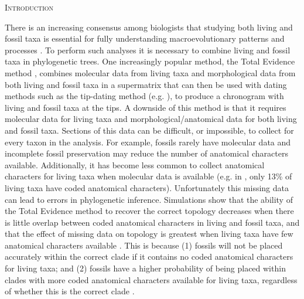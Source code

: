 \documentclass[12pt,letterpaper]{article}
\renewcommand{\section}[1]{%
\bigskip
\begin{center}
\begin{Large}
\normalfont\scshape #1
\medskip
\end{Large}
\end{center}}
\begin{document}
%
%
\newpage 
\section{Introduction}

There is an increasing consensus among biologists that studying both living and fossil taxa is essential for fully understanding macroevolutionary patterns and processes \cite{slaterunifying2013,fritzdiversity2013}.
To perform such analyses it is necessary to combine living and fossil taxa in phylogenetic trees.
One increasingly popular method, the Total Evidence method \cite{ronquista2012}, combines molecular data from living taxa and morphological data %
 from both living and fossil taxa in a supermatrix that can then be used with dating methods such as the tip-dating method (e.g. \cite{pyrondivergence2011,ronquista2012,schragocombining2013,slaterunifying2013,beckancient2014}), to produce a chronogram with living and fossil taxa at the tips. 
A downside of this method is that it requires molecular data for living taxa and morphological/anatomical data for both living and fossil taxa. %
Sections of this data can be difficult, or impossible, to collect for every taxon in the analysis.
For example, fossils rarely have molecular data and incomplete fossil preservation may reduce the number of anatomical characters available.
Additionally, it has become less common to collect anatomical characters for living taxa when molecular data is available (e.g. in \cite{slaterphylogenetic2013}, only 13\% of living taxa have coded anatomical characters).
Unfortunately this missing data can lead to errors in phylogenetic inference.
Simulations show that the ability of the Total Evidence method to recover the correct topology decreases when there is little overlap between coded anatomical characters in living and fossil taxa, and that the effect of missing data on topology is greatest when living taxa have few anatomical characters available \cite{GuillermeCooper}.
This is because (1) fossils will not be placed accurately within the correct clade if it contains no coded anatomical characters for living taxa; and (2) fossils have a higher probability of being placed within clades with more coded anatomical characters available for living taxa, regardless of whether this is the correct clade \cite{GuillermeCooper}. 
\end{document}
